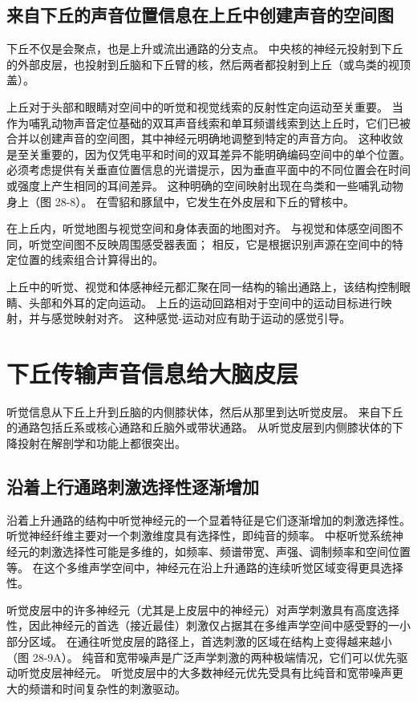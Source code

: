 

\subsection{来自下丘的声音位置信息在上丘中创建声音的空间图}
下丘不仅是会聚点，也是上升或流出通路的分支点。 中央核的神经元投射到下丘的外部皮层，也投射到丘脑和下丘臂的核，然后两者都投射到上丘（或鸟类的视顶盖）。

上丘对于头部和眼睛对空间中的听觉和视觉线索的反射性定向运动至关重要。 当作为哺乳动物声音定位基础的双耳声音线索和单耳频谱线索到达上丘时，它们已被合并以创建声音的空间图，其中神经元明确地调整到特定的声音方向。 这种收敛是至关重要的，因为仅凭电平和时间的双耳差异不能明确编码空间中的单个位置。 必须考虑提供有关垂直位置信息的光谱提示，因为垂直平面中的不同位置会在时间或强度上产生相同的耳间差异。 这种明确的空间映射出现在鸟类和一些哺乳动物身上（图 28-8）。 在雪貂和豚鼠中，它发生在外皮层和下丘的臂核中。

在上丘内，听觉地图与视觉空间和身体表面的地图对齐。 与视觉和体感空间图不同，听觉空间图不反映周围感受器表面； 相反，它是根据识别声源在空间中的特定位置的线索组合计算得出的。

上丘中的听觉、视觉和体感神经元都汇聚在同一结构的输出通路上，该结构控制眼睛、头部和外耳的定向运动。 上丘的运动回路相对于空间中的运动目标进行映射，并与感觉映射对齐。 这种感觉-运动对应有助于运动的感觉引导。



\section{下丘传输声音信息给大脑皮层}
听觉信息从下丘上升到丘脑的内侧膝状体，然后从那里到达听觉皮层。 来自下丘的通路包括丘系或核心通路和丘脑外或带状通路。 从听觉皮层到内侧膝状体的下降投射在解剖学和功能上都很突出。

\subsection{沿着上行通路刺激选择性逐渐增加}
沿着上升通路的结构中听觉神经元的一个显着特征是它们逐渐增加的刺激选择性。 听觉神经纤维主要对一个刺激维度具有选择性，即纯音的频率。 中枢听觉系统神经元的刺激选择性可能是多维的，如频率、频谱带宽、声强、调制频率和空间位置等。 在这个多维声学空间中，神经元在沿上升通路的连续听觉区域变得更具选择性。

听觉皮层中的许多神经元（尤其是上皮层中的神经元）对声学刺激具有高度选择性，因此神经元的首选（接近最佳）刺激仅占据其在多维声学空间中感受野的一小部分区域。 在通往听觉皮层的路径上，首选刺激的区域在结构上变得越来越小（图 28-9A）。 纯音和宽带噪声是广泛声学刺激的两种极端情况，它们可以优先驱动听觉皮层神经元。 听觉皮层中的大多数神经元优先受具有比纯音和宽带噪声更大的频谱和时间复杂性的刺激驱动。

